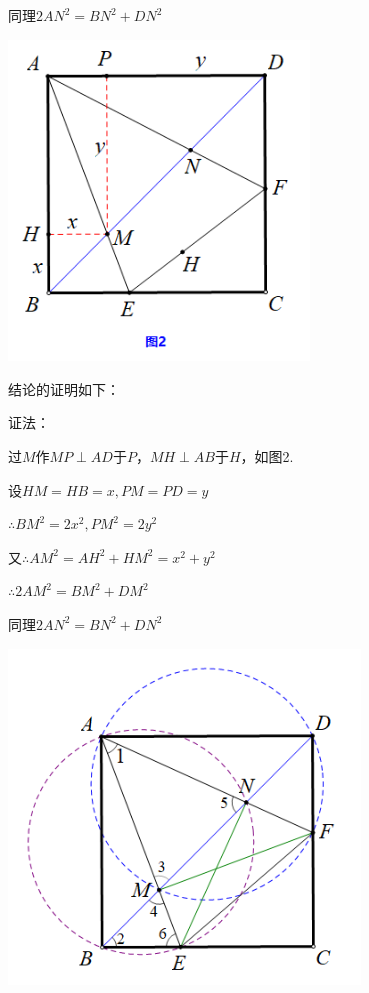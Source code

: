 \documentclass[10pt]{ctexart}
\begin{document}
{\begin{minipage}[h]{0.6\textwidth}
同理$2AN^2=BN^2+DN^2$		
\end{minipage}
\quad
\begin{minipage}[h]{0.4\textwidth}
	\centering
	\includegraphics[width=0.6\textwidth]{figure/banjiao15}
\end{minipage}
}

结论的证明如下：

\begin{minipage}[h]{0.6\textwidth}
	证法：
	
	过$M$作$MP \perp AD$于$P$，$MH \perp AB$于$H$，如图2.
	
	设$HM=HB=x,PM=PD=y$
	
	$\therefore BM^2=2x^2,PM^2=2y^2$
	
	又$\therefore AM^2=AH^2+HM^2=x^2+y^2$
	
	$\therefore 2AM^2=BM^2+DM^2$
	
	同理$2AN^2=BN^2+DN^2$		
\end{minipage}
\quad
\begin{minipage}[h]{0.4\textwidth}
	\centering
	\includegraphics[width=0.7\textwidth]{figure/banjiao16}
\end{minipage}
\end{document}

